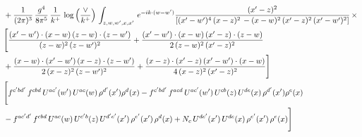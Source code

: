 \documentclass[9pt]{article}
\numberwithin{equation}{section}
\begin{document}
\begin{align}
&  + \frac{1}{(2\pi)^{3}}\, \frac{g^{4}}{8\pi^{5}}\,\frac{1}{k^{+}}\,\log{\left(\frac{\vee}{k^{+}}\right)}\,\int_{z,w,w^{\prime},x,x'}\, e^{-ik\cdot (w-w')} \frac{(x'-z)^{2}}{\left[(x'-w')^{4}\,(x-z)^{2}\, - (x-w)^{2}\, (x'-z)^{2}\,(x'-w')^{2}\right]}\,  \times\notag \\ & \Bigg[\frac{(x'-w')\cdot (x-w)\, (z-w)\cdot (z-w')}{(z-w)^{2}\, (z-w')^{2}}+\frac{(x'-w')\cdot (x-w)\, (x'-z)\cdot (z-w)}{2\, (z-w)^{2}\, (x'-z)^{2}}\notag \\ & +\frac{(x-w)\cdot (x'-w')\, (x-z)\cdot (z-w')}{2\, (x-z)^{2}\, (z-w')^{2}}+\frac{(x-z)\cdot (x'-z)\, (x'-w')\cdot (x-w)}{4\, (x-z)^{2}\, (x'-z)^{2}}\Bigg] \notag \\ & \Bigg[f^{c'bd'}\,f^{cbd}\, U^{ac'}(w')\,U^{ac}(w)\,\rho^{d'}(x')\rho^{d}(x)- f^{c'bd'}\,f^{acd}\,U^{ac'}(w')\,U^{cb}(z)\,U^{de}(x)\,\rho^{d'}(x')\rho^{e}(x) \notag \\ & -f^{ac'd'}\,f^{cbd}\,U^{ac}(w)\,U^{c'b}(z)\,U^{d'e'}(x')\,\rho^{e'}(x')\,\rho^{d}(x) +N_{c}\,U^{de'}(x')\,U^{de}(x)\,\rho^{e'}(x')\,\rho^{e}(x)\Bigg]
\end{align}
\end{document}
